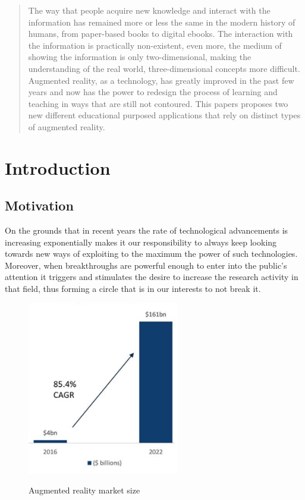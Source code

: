 \documentclass[12 pct]{report}
\begin{document}
\begin{abstract}
The way that people acquire new knowledge and interact with the information has remained more or less the same in the modern history of humans, from paper-based books to digital ebooks. The interaction with the information is practically non-existent, even more, the medium of showing the information is only two-dimensional, making the understanding of the real world, three-dimensional concepts more difficult. Augmented reality, as a technology, has greatly improved in the past few years and now has the power to redesign the process of learning and teaching in ways that are still not contoured. This papers proposes two new different educational purposed applications that rely on distinct types of augmented reality.
\end{abstract}

\tableofcontents

\listoffigures

\listoftables

\chapter{Introduction}

\section{Motivation}
On the grounds that in recent years the rate of technological advancements is increasing exponentially makes it our responsibility to always keep looking towards new ways of exploiting to the maximum the power of such technologies. Moreover, when breakthroughs are powerful enough to enter into the public's attention it triggers and stimulates the desire to increase the research activity in that field, thus forming a circle that is in our interests to not break it.

\begin{figure}[H]
\includegraphics[width=0.59\textwidth]{ar-chart}
\centering
\label{fig:feature-points}
\caption{Augmented reality market size \cite{consultancy.uk}}
\end{figure}
\end{document}

